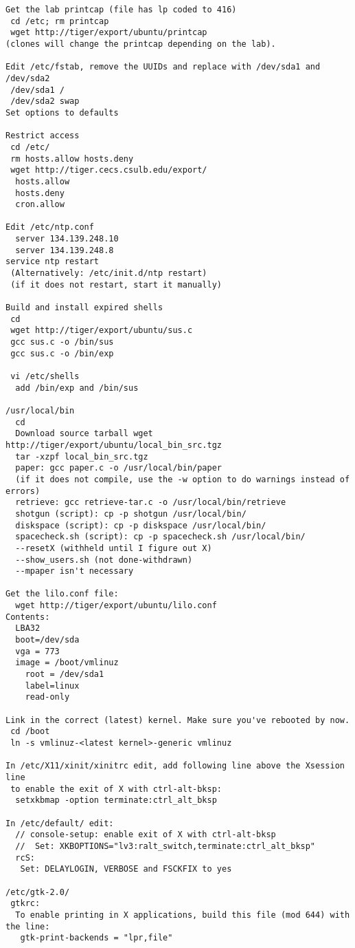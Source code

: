 \begin{verbatim}
Get the lab printcap (file has lp coded to 416)
 cd /etc; rm printcap
 wget http://tiger/export/ubuntu/printcap
(clones will change the printcap depending on the lab).

Edit /etc/fstab, remove the UUIDs and replace with /dev/sda1 and /dev/sda2
 /dev/sda1 /
 /dev/sda2 swap
Set options to defaults

Restrict access
 cd /etc/
 rm hosts.allow hosts.deny
 wget http://tiger.cecs.csulb.edu/export/
  hosts.allow
  hosts.deny
  cron.allow

Edit /etc/ntp.conf
  server 134.139.248.10
  server 134.139.248.8
service ntp restart
 (Alternatively: /etc/init.d/ntp restart)
 (if it does not restart, start it manually)

Build and install expired shells
 cd
 wget http://tiger/export/ubuntu/sus.c
 gcc sus.c -o /bin/sus
 gcc sus.c -o /bin/exp

 vi /etc/shells
  add /bin/exp and /bin/sus

/usr/local/bin
  cd
  Download source tarball wget http://tiger/export/ubuntu/local_bin_src.tgz
  tar -xzpf local_bin_src.tgz
  paper: gcc paper.c -o /usr/local/bin/paper
  (if it does not compile, use the -w option to do warnings instead of errors)
  retrieve: gcc retrieve-tar.c -o /usr/local/bin/retrieve
  shotgun (script): cp -p shotgun /usr/local/bin/ 
  diskspace (script): cp -p diskspace /usr/local/bin/ 
  spacecheck.sh (script): cp -p spacecheck.sh /usr/local/bin/
  --resetX (withheld until I figure out X)
  --show_users.sh (not done-withdrawn)
  --mpaper isn't necessary

Get the lilo.conf file:
  wget http://tiger/export/ubuntu/lilo.conf
Contents:
  LBA32
  boot=/dev/sda
  vga = 773
  image = /boot/vmlinuz
    root = /dev/sda1
    label=linux
    read-only

Link in the correct (latest) kernel. Make sure you've rebooted by now.
 cd /boot
 ln -s vmlinuz-<latest kernel>-generic vmlinuz

In /etc/X11/xinit/xinitrc edit, add following line above the Xsession line
 to enable the exit of X with ctrl-alt-bksp:
  setxkbmap -option terminate:ctrl_alt_bksp

In /etc/default/ edit:
  // console-setup: enable exit of X with ctrl-alt-bksp
  //  Set: XKBOPTIONS="lv3:ralt_switch,terminate:ctrl_alt_bksp"
  rcS:
   Set: DELAYLOGIN, VERBOSE and FSCKFIX to yes

/etc/gtk-2.0/
 gtkrc:
  To enable printing in X applications, build this file (mod 644) with the line:
   gtk-print-backends = "lpr,file"


\end{verbatim}

